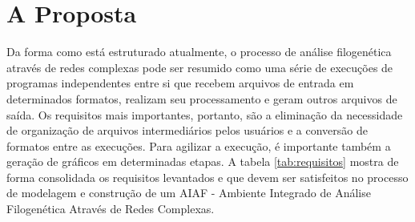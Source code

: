 \section{A Proposta} \label{sec:proposta}

Da forma como está estruturado atualmente, o processo de análise filogenética através de redes complexas pode ser resumido como uma série de execuções
de programas independentes entre si que recebem arquivos
de entrada em determinados formatos, realizam seu
processamento e geram outros arquivos de saída. Os requisitos mais importantes, portanto, são a eliminação da necessidade de organização de arquivos
intermediários pelos usuários e a conversão de formatos entre as execuções. Para agilizar a execução, é importante também a geração de gráficos em
determinadas etapas. A tabela \ref{tab:requisitos} mostra de forma consolidada os requisitos levantados e que devem ser satisfeitos no processo de
modelagem e construção de um AIAF -
Ambiente Integrado de Análise Filogenética
Através de Redes Complexas.

